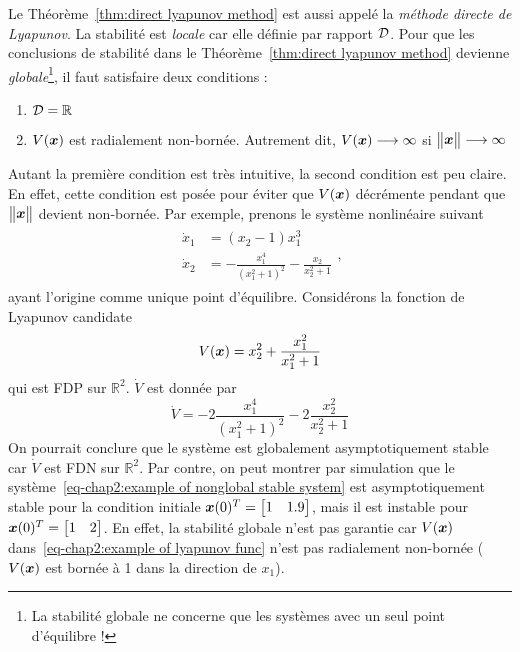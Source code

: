 Le Théorème~\ref{thm:direct lyapunov method} est aussi appelé la \emph{méthode directe de Lyapunov}. La stabilité est \emph{locale} car elle définie par rapport $ {\cal D}$. Pour que les conclusions de stabilité dans le Théorème~\ref{thm:direct lyapunov method} devienne \emph{globale}\footnote{La stabilité globale ne concerne que les systèmes avec un seul point d'équilibre !}, il faut satisfaire deux conditions : 
\begin{enumerate}
	\item ${\cal D}=\mathbb{R}$
	\item $V(\bm{x})$ est radialement non-bornée. Autrement dit, $V(\bm{x})\longrightarrow\infty$ si  $\begin{Vmatrix} \bm{x} \end{Vmatrix}\longrightarrow\infty$
\end{enumerate}
Autant la première condition est très intuitive, la second condition est peu claire. En effet, cette condition est posée pour éviter que $V(\bm{x})$ décrémente pendant que $\begin{Vmatrix} \bm{x} \end{Vmatrix}$ devient non-bornée. Par exemple, prenons le système nonlinéaire suivant 
\begin{align}\label{eq-chap2:example of nonglobal stable system}
	\begin{split}
		\dot{x}_1 &=(x_2-1)x_1^3\\
		\dot{x}_2 &=-\frac{x_1^4}{(x_1^2+1)^2}-\frac{x_2}{x_2^2+1}
	\end{split},
\end{align}
ayant l'origine comme unique point d'équilibre. Considérons la fonction de Lyapunov candidate
\begin{equation}\label{eq-chap2:example of lyapunov func}
	V(\bm{x}) = x_2^2 + \frac{x_1^2}{x_1^2+1}
\end{equation}
qui est FDP sur $\mathbb{R}^2$. $\dot{V}$ est donnée par 
\begin{equation*}
	\dot{V} = -2\frac{x_1^4}{(x_1^2+1)^2}-2\frac{x_2^2}{x_2^2+1}
\end{equation*}
On pourrait conclure que le système est globalement asymptotiquement stable car $\dot{V}$ est FDN sur $\mathbb{R}^2$. Par contre, on peut montrer par simulation que le système~\eqref{eq-chap2:example of nonglobal stable system} est asymptotiquement stable pour la condition initiale $\bm{x}(0)^T=\begin{bmatrix}
1 & 1.9
\end{bmatrix}$, mais il est instable pour  $\bm{x}(0)^T=\begin{bmatrix}
1 & 2
\end{bmatrix}$. En effet, la stabilité globale n'est pas garantie car $V(\bm{x})$ dans~\eqref{eq-chap2:example of lyapunov func} n'est pas radialement non-bornée ($V(\bm{x})$ est bornée à 1 dans la direction de $x_1$). 

